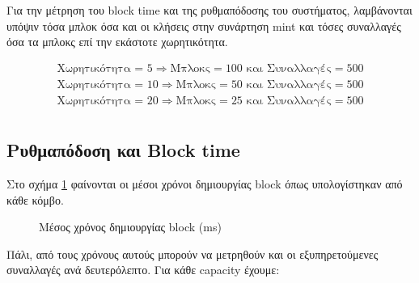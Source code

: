 \documentclass{article}
\newcommand{\eng}[1]{\foreignlanguage{english}{#1}} %
\begin{document}
Για την μέτρηση του \eng{block time} και της ρυθμαπόδοσης του συστήματος, λαμβάνονται
υπόψιν τόσα μπλοκ όσα και οι κλήσεις στην συνάρτηση \eng{mint} και τόσες συναλλαγές
όσα τα μπλοκς επί την εκάστοτε χωρητικότητα.

\begin{equation}
    \begin{gathered}
        \text{Χωρητικότητα = 5} \Rightarrow \text{Μπλοκς} = 100 \text{ και } \text{Συναλλαγές} = 500 \\
        \text{Χωρητικότητα = 10} \Rightarrow \text{Μπλοκς} = 50 \text{ και } \text{Συναλλαγές} = 500 \\
        \text{Χωρητικότητα = 20} \Rightarrow \text{Μπλοκς} = 25 \text{ και } \text{Συναλλαγές} = 500 \\
    \end{gathered}
\end{equation}

\clearpage
\subsection{Ρυθμαπόδοση και \eng{Block time}}

Στο σχήμα \ref{fig:scalability-blocktimes} φαίνονται οι μέσοι χρόνοι δημιουργίας
\eng{block} όπως υπολογίστηκαν από κάθε κόμβο.

\begin{figure}[ht]
    \centering
    \begin{varwidth}{\linewidth}
        
    \end{varwidth}
    \caption{Μέσος χρόνος δημιουργίας \eng{block} (\eng{ms})}
    \label{fig:scalability-blocktimes}
\end{figure}

Πάλι, από τους χρόνους αυτούς μπορούν να μετρηθούν και οι εξυπηρετούμενες
συναλλαγές ανά δευτερόλεπτο. Για κάθε \eng{capacity} έχουμε:
\end{document}
